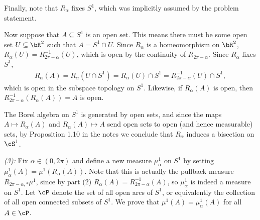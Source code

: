 \begin{homework}[e]
\begin{prf}
		Finally, note that $R_\alpha$ fixes $S^1$, which was implicitly assumed by the problem statement.

		Now suppose that $A \subseteq S^1$ is an open set. This means there must be some open set $U \subseteq \bR^2$ such that $A = S^1 \cap U$. Since $R_\alpha$ is a homeomorphism on $\bR^2$, $R_\alpha(U) = R^{-1}_{2\pi - \alpha}(U)$, which is open by the continuity of $R_{2\pi - \alpha}$. Since $R_\alpha$ fixes $S^1$,
		\begin{align*}
			R_\alpha(A) = R_\alpha(U \cap S^1) = R_\alpha(U) \cap S^1 = R^{-1}_{2\pi - \alpha}(U) \cap S^1,
		\end{align*}
		which is open in the subspace topology on $S^1$. Likewise, if $R_\alpha(A)$ is open, then $R^{-1}_{2\pi - \alpha}(R_\alpha(A)) = A$ is open.

		The Borel algebra on $S^1$ is generated by open sets, and since the maps $A \mapsto R_\alpha(A)$ and $R_\alpha(A) \mapsto A$ send open sets to open (and hence measurable) sets, by Proposition 1.10 in the notes we conclude that $R_\alpha$ induces a bisection on $\cS^1$.

		\bigskip

		\noindent \emph{(3):} \hspace{0.5em} Fix $\alpha \in (0,2\pi)$ and define a new measure $\mu^1_\alpha$ on $S^1$ by setting $\mu^1_\alpha(A) = \mu^1(R_\alpha(A))$. Note that this is actually the pullback measure $R_{2\pi-\alpha,*}\mu^1$, since by part (2) $R_\alpha(A) = R^{-1}_{2\pi - \alpha}(A)$, so $\mu^1_\alpha$ is indeed a measure on $S^1$. Let $\cP$ denote the set of all open arcs of $S^1$, or equivalently the collection of all open connected subsets of $S^1$. We prove that $\mu^1(A) = \mu^1_\alpha(A)$ for all $A\in \cP$.


\end{prf}
\end{homework}
